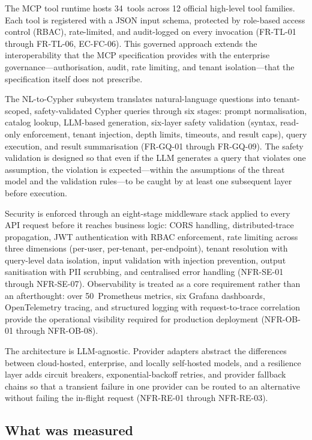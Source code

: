 \documentclass[a4paper,noexaminfo]{sapthesis}
\newcommand{\CategoryCount}{12}
\begin{document}
The MCP tool runtime hosts 34~tools across \CategoryCount{} official
high-level tool families.
Each tool is registered with a JSON input schema, protected by role-based
access control (RBAC), rate-limited, and audit-logged on every invocation
(FR-TL-01 through FR-TL-06, EC-FC-06).  This governed approach extends the
interoperability that the MCP specification provides with the enterprise
governance---authorisation, audit, rate limiting, and tenant
isolation---that the specification itself does not prescribe.

The NL-to-Cypher subsystem translates natural-language questions into
tenant-scoped, safety-validated Cypher queries through six stages: prompt
normalisation, catalog lookup, LLM-based generation, six-layer safety
validation (syntax, read-only enforcement, tenant injection, depth limits,
timeouts, and result caps), query execution, and result summarisation
(FR-GQ-01 through FR-GQ-09).  The safety validation is designed so that
even if the LLM generates a query that violates one assumption, the
violation is expected---within the assumptions of the threat model and
the validation rules---to be caught by at least one subsequent layer
before execution.

Security is enforced through an eight-stage middleware stack applied to
every API request before it reaches business logic: CORS handling,
distributed-trace propagation, JWT authentication with RBAC enforcement,
rate limiting across three dimensions (per-user, per-tenant,
per-endpoint), tenant resolution with query-level data isolation, input
validation with injection prevention, output sanitisation with PII
scrubbing, and centralised error handling (NFR-SE-01 through NFR-SE-07).
Observability is treated as a core requirement rather than an
afterthought: over 50~Prometheus metrics, six
Grafana dashboards, OpenTelemetry tracing, and structured logging with
request-to-trace correlation provide the operational visibility required
for production deployment (NFR-OB-01 through NFR-OB-08).

The architecture is LLM-agnostic.  Provider adapters abstract the differences
between cloud-hosted, enterprise, and locally self-hosted models, and a
resilience layer adds circuit breakers, exponential-backoff retries, and
provider fallback chains so that a transient failure in one provider can
be routed to an alternative without failing the in-flight request
(NFR-RE-01 through NFR-RE-03).

\subsection{What was measured}
\end{document}
